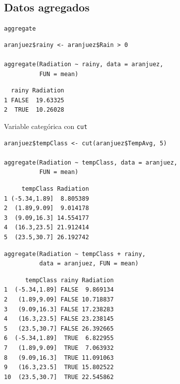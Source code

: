 \documentclass[xcolor={usenames,svgnames,dvipsnames}]{beamer}
\begin{document}
\subsection{Datos agregados}
\label{sec-5-3}
\begin{frame}[fragile,label=sec-5-3-1]{\texttt{aggregate}}
 \lstset{language=R,label= ,caption= ,numbers=none}
\begin{lstlisting}
aranjuez$rainy <- aranjuez$Rain > 0

aggregate(Radiation ~ rainy, data = aranjuez,
          FUN = mean)
\end{lstlisting}

\begin{verbatim}
  rainy Radiation
1 FALSE  19.63325
2  TRUE  10.26028
\end{verbatim}
\end{frame}

\begin{frame}[fragile,label=sec-5-3-2]{Variable categórica con \texttt{cut}}
 \lstset{language=R,label= ,caption= ,numbers=none}
\begin{lstlisting}
aranjuez$tempClass <- cut(aranjuez$TempAvg, 5)

aggregate(Radiation ~ tempClass, data = aranjuez,
          FUN = mean)
\end{lstlisting}

\begin{verbatim}
     tempClass Radiation
1 (-5.34,1.89]  8.805389
2  (1.89,9.09]  9.014178
3  (9.09,16.3] 14.554177
4  (16.3,23.5] 21.912414
5  (23.5,30.7] 26.192742
\end{verbatim}

\lstset{language=R,label= ,caption= ,numbers=none}
\begin{lstlisting}
aggregate(Radiation ~ tempClass + rainy,
          data = aranjuez, FUN = mean)
\end{lstlisting}

\begin{verbatim}
      tempClass rainy Radiation
1  (-5.34,1.89] FALSE  9.869134
2   (1.89,9.09] FALSE 10.718837
3   (9.09,16.3] FALSE 17.238283
4   (16.3,23.5] FALSE 23.238145
5   (23.5,30.7] FALSE 26.392665
6  (-5.34,1.89]  TRUE  6.822955
7   (1.89,9.09]  TRUE  7.063932
8   (9.09,16.3]  TRUE 11.091063
9   (16.3,23.5]  TRUE 15.802522
10  (23.5,30.7]  TRUE 22.545862
\end{verbatim}
\end{frame}
\end{document}
